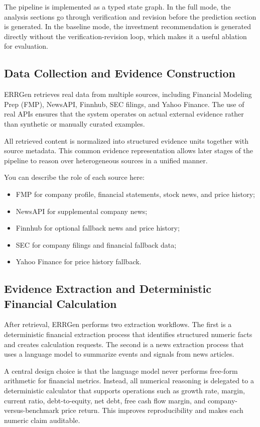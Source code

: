 \documentclass[11pt,a4paper]{article}
\begin{document}
The pipeline is implemented as a typed state graph. In the full mode, the
analysis sections go through verification and revision before the prediction
section is generated. In the baseline mode, the investment recommendation is
generated directly without the verification-revision loop, which makes it a
useful ablation for evaluation.

\subsection{Data Collection and Evidence Construction}
ERRGen retrieves real data from multiple sources, including Financial Modeling
Prep (FMP), NewsAPI, Finnhub, SEC filings, and Yahoo Finance. The use of real
APIs ensures that the system operates on actual external evidence rather than
synthetic or manually curated examples.

All retrieved content is normalized into structured evidence units together
with source metadata. This common evidence representation allows later stages
of the pipeline to reason over heterogeneous sources in a unified manner.

You can describe the role of each source here:
\begin{itemize}[leftmargin=1.5em]
    \item FMP for company profile, financial statements, stock news, and price
    history;
    \item NewsAPI for supplemental company news;
    \item Finnhub for optional fallback news and price history;
    \item SEC for company filings and financial fallback data;
    \item Yahoo Finance for price history fallback.
\end{itemize}

\subsection{Evidence Extraction and Deterministic Financial Calculation}
After retrieval, ERRGen performs two extraction workflows. The first is a
deterministic financial extraction process that identifies structured numeric
facts and creates calculation requests. The second is a news extraction process
that uses a language model to summarize events and signals from news articles.

A central design choice is that the language model never performs free-form
arithmetic for financial metrics. Instead, all numerical reasoning is delegated
to a deterministic calculator that supports operations such as growth rate,
margin, current ratio, debt-to-equity, net debt, free cash flow margin, and
company-versus-benchmark price return. This improves reproducibility and makes
each numeric claim auditable.
\end{document}
